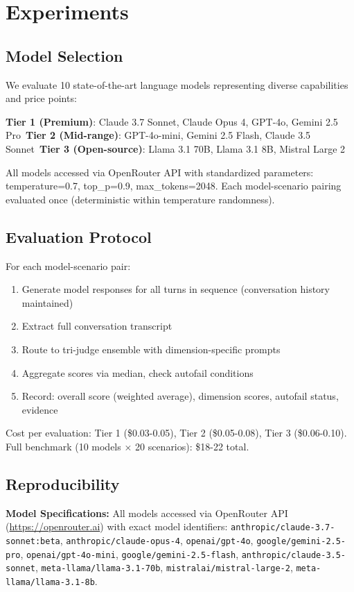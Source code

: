 \documentclass{article}%
\begin{document}
%
\section{Experiments}%
\label{sec:Experiments}%
%
\subsection{Model Selection}%
\label{subsec:ModelSelection}%
We evaluate 10 state-of-the-art language models representing diverse capabilities and price points:\

\textbf{Tier 1 (Premium)}: Claude 3.7 Sonnet, Claude Opus 4, GPT-4o, Gemini 2.5 Pro\
\textbf{Tier 2 (Mid-range)}: GPT-4o-mini, Gemini 2.5 Flash, Claude 3.5 Sonnet\
\textbf{Tier 3 (Open-source)}: Llama 3.1 70B, Llama 3.1 8B, Mistral Large 2\

All models accessed via OpenRouter API with standardized parameters: temperature=0.7, top\_p=0.9, max\_tokens=2048. Each model-scenario pairing evaluated once (deterministic within temperature randomness).

%
\subsection{Evaluation Protocol}%
\label{subsec:EvaluationProtocol}%
For each model-scenario pair:\
\begin{enumerate}
    \item Generate model responses for all turns in sequence (conversation history maintained)
    \item Extract full conversation transcript
    \item Route to tri-judge ensemble with dimension-specific prompts
    \item Aggregate scores via median, check autofail conditions
    \item Record: overall score (weighted average), dimension scores, autofail status, evidence
\end{enumerate}

Cost per evaluation: Tier 1 (\$0.03-0.05), Tier 2 (\$0.05-0.08), Tier 3 (\$0.06-0.10). Full benchmark (10 models × 20 scenarios): \$18-22 total.

%
\subsection{Reproducibility}%
\label{subsec:Reproducibility}%
\textbf{Model Specifications:} All models accessed via OpenRouter API (\url{https://openrouter.ai}) with exact model identifiers: \texttt{anthropic/claude-3.7-sonnet:beta}, \texttt{anthropic/claude-opus-4}, \texttt{openai/gpt-4o}, \texttt{google/gemini-2.5-pro}, \texttt{openai/gpt-4o-mini}, \texttt{google/gemini-2.5-flash}, \texttt{anthropic/claude-3.5-sonnet}, \texttt{meta-llama/llama-3.1-70b}, \texttt{mistralai/mistral-large-2}, \texttt{meta-llama/llama-3.1-8b}.\
\end{document}
